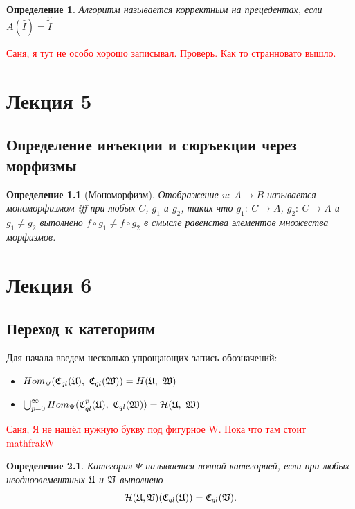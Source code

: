 \documentclass[a4paper, 12pt]{report}
\newtheorem{definition}{Определение}[chapter]
\begin{document}
\begin{definition}
Алгоритм называется корректным на прецедентах, если $A(\hat{I}) = \hat{\tilde{I}}$
\end{definition}
\textcolor{red}{Саня, я тут не особо хорошо записывал. Проверь. Как то странновато вышло.}

\chapter{Лекция 5}
\section{Определение инъекции и сюръекции через морфизмы}

\begin{definition}[Мономорфизм]
Отображение $u:\ A \rightarrow B$ называется мономорфизмом iff при любых $C$, $g_1$ и $g_2$, таких что $g_1:\ C \rightarrow A$, $g_2:\ C \rightarrow A$ и $g_1 \neq g_2$ выполнено $f \circ g_1 \neq f \circ g_2$ в смысле равенства элементов множества морфизмов.
\end{definition}

\chapter{Лекция 6}
\section{Переход к категориям}
Для начала введем несколько упрощающих запись обозначений:
\begin{itemize}
  \item $Hom_{\Psi}(\Cql(\frakU),\ \Cql(\frakW)) = H(\frakU,\ \frakW)$
  \item $\bigcup_{p=0}^{\infty}Hom_{\Psi}(\Cql^p(\frakU),\ \Cql(\frakW)) = \calH(\frakU,\ \frakW)$
\end{itemize}
\textcolor{red}{Саня, Я не нашёл нужную букву под фигурное W. Пока что там стоит mathfrak{W}}
\begin{definition}
Категория $\Psi$ называется полной категорией, если при любых неодноэлементных $\mathfrak{U}$ и $\mathfrak{V}$ выполнено
\[
\mathcal{H}(\mathfrak{U}, \mathfrak{V})(\mathfrak{C}_{ql}(\mathfrak{U})) = \mathfrak{C}_{ql}(\mathfrak{V}).
\]
\end{definition}
\end{document}
